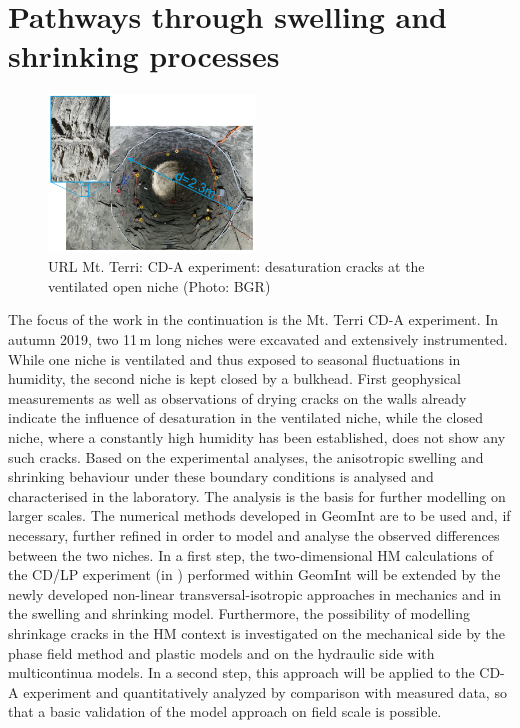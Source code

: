\section{Pathways through swelling and shrinking processes}
\label{sec:wp1-plan}

\begin{figure}
\vspace{-5mm}
\centering
\includegraphics[width=0.49\textwidth]{figures/CDA_open_niche}
\caption{URL Mt. Terri: CD-A experiment: desaturation cracks at the ventilated open niche (Photo: BGR)}
\label{fig:cd-a}
\end{figure}
The focus of the work in the continuation is the Mt. Terri CD-A experiment. In autumn 2019, two 11\,m long niches were excavated and extensively instrumented. While one niche is ventilated and thus exposed to seasonal fluctuations in humidity, the second niche is kept closed by a bulkhead. First geophysical measurements as well as observations of drying cracks on the walls already indicate the influence of desaturation in the ventilated niche, while the closed niche, where a constantly high humidity has been established, does not show any such cracks. Based on the experimental analyses, the anisotropic swelling and shrinking behaviour under these boundary conditions is analysed and characterised in the laboratory. The analysis is the basis for further modelling on larger scales. 
The numerical methods \cite{Yoshioka2019,Parisio2019102} developed in GeomInt are to be used and, if necessary, further refined in order to model and analyse the observed differences between the two niches. In a first step, the two-dimensional HM calculations of the CD/LP experiment (in \cite{Kolditz2020b}) performed within GeomInt will be extended by the newly developed non-linear transversal-isotropic approaches in mechanics and in the swelling and shrinking model. Furthermore, the possibility of modelling shrinkage cracks in the HM context is investigated on the mechanical side by the phase field method and plastic models and on the hydraulic side with multicontinua models. In a second step, this approach will be applied to the CD-A experiment and quantitatively analyzed by comparison with measured data, so that a basic validation of the model approach on field scale is possible. 


